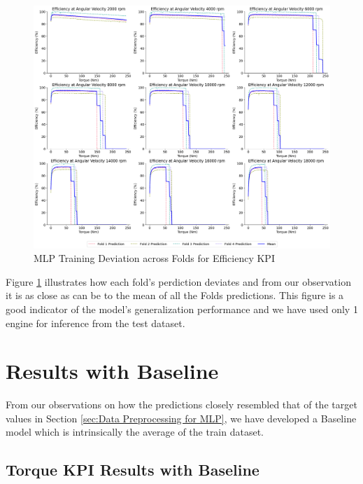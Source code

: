 \documentclass{report} %
\begin{document}
\begin{figure}[H]
    \centering
    \includegraphics[width=1\textwidth]{./ReportImages/folds_dev_y2.png} 
    \caption{MLP Training Deviation across Folds for Efficiency \ac{KPI}} 
    \label{fig:MLP Training Deviation across Folds for Efficiency KPI}
\end{figure}

Figure \ref{fig:MLP Training Deviation across Folds for Efficiency KPI} illustrates how each fold's perdiction deviates and from our observation it is 
as close as can be to the mean of all the Folds predictions.
This figure is a good indicator of the model's generalization performance and we have used only 1 engine for inference from the test dataset.


\section{Results with Baseline}\label{sec:Results with Baseline}

From our observations on how the predictions closely resembled that of the target values in Section \ref{sec:Data Preprocessing for MLP}, we have developed a Baseline model which is intrinsically the average of the train dataset.

\subsection{Torque \ac{KPI} Results with Baseline}\label{sec:3D Efficiency Grid Results with Baseline}
\end{document}
